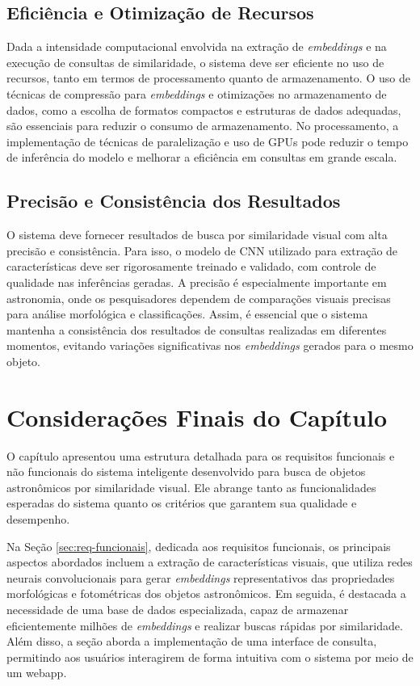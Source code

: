 \subsection{Eficiência e Otimização de Recursos}
\label{sec:req-eficiencia}

Dada a intensidade computacional envolvida na extração de \emph{embeddings} e na execução de consultas de similaridade, o sistema deve ser eficiente no uso de recursos, tanto em termos de processamento quanto de armazenamento. O uso de técnicas de compressão para \emph{embeddings} e otimizações no armazenamento de dados, como a escolha de formatos compactos e estruturas de dados adequadas, são essenciais para reduzir o consumo de armazenamento. No processamento, a implementação de técnicas de paralelização e uso de GPUs pode reduzir o tempo de inferência do modelo e melhorar a eficiência em consultas em grande escala.



\subsection{Precisão e Consistência dos Resultados}
\label{sec:req-precisao}

O sistema deve fornecer resultados de busca por similaridade visual com alta precisão e consistência. Para isso, o modelo de CNN utilizado para extração de características deve ser rigorosamente treinado e validado, com controle de qualidade nas inferências geradas. A precisão é especialmente importante em astronomia, onde os pesquisadores dependem de comparações visuais precisas para análise morfológica e classificações. Assim, é essencial que o sistema mantenha a consistência dos resultados de consultas realizadas em diferentes momentos, evitando variações significativas nos \emph{embeddings} gerados para o mesmo objeto.



\section{Considerações Finais do Capítulo}
O capítulo apresentou uma estrutura detalhada para os requisitos funcionais e não funcionais do sistema inteligente desenvolvido para busca de objetos astronômicos por similaridade visual. Ele abrange tanto as funcionalidades esperadas do sistema quanto os critérios que garantem sua qualidade e desempenho.

Na Seção \ref{sec:req-funcionais}, dedicada aos requisitos funcionais, os principais aspectos abordados incluem a extração de características visuais, que utiliza redes neurais convolucionais para gerar \emph{embeddings} representativos das propriedades morfológicas e fotométricas dos objetos astronômicos. Em seguida, é destacada a necessidade de uma base de dados especializada, capaz de armazenar eficientemente milhões de \emph{embeddings} e realizar buscas rápidas por similaridade. Além disso, a seção aborda a implementação de uma interface de consulta, permitindo aos usuários interagirem de forma intuitiva com o sistema por meio de um webapp.

